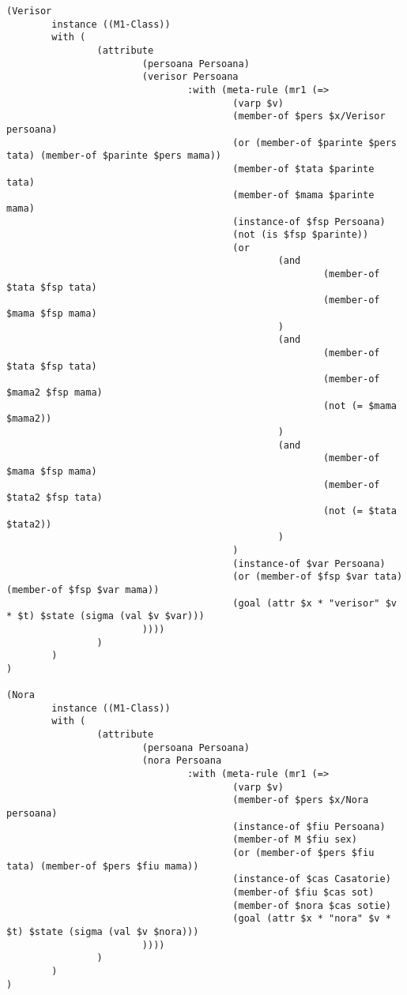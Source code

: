 \documentclass{article}
\begin{document}
{\begin{verbatim}
(Verisor
        instance ((M1-Class))
        with (
                (attribute
                        (persoana Persoana)
                        (verisor Persoana
                                :with (meta-rule (mr1 (=>
                                        (varp $v)
                                        (member-of $pers $x/Verisor persoana)
                                        (or (member-of $parinte $pers tata) (member-of $parinte $pers mama))
                                        (member-of $tata $parinte tata)
                                        (member-of $mama $parinte mama)
                                        (instance-of $fsp Persoana)
                                        (not (is $fsp $parinte))
                                        (or
                                                (and
                                                        (member-of $tata $fsp tata)
                                                        (member-of $mama $fsp mama)
                                                )
                                                (and
                                                        (member-of $tata $fsp tata)
                                                        (member-of $mama2 $fsp mama)
                                                        (not (= $mama $mama2))
                                                )
                                                (and
                                                        (member-of $mama $fsp mama)
                                                        (member-of $tata2 $fsp tata)
                                                        (not (= $tata $tata2))
                                                )
                                        )
                                        (instance-of $var Persoana)
                                        (or (member-of $fsp $var tata) (member-of $fsp $var mama))
                                        (goal (attr $x * "verisor" $v * $t) $state (sigma (val $v $var)))
                        ))))
                )
        )
)

(Nora
        instance ((M1-Class))
        with (
                (attribute
                        (persoana Persoana)
                        (nora Persoana
                                :with (meta-rule (mr1 (=>
                                        (varp $v)
                                        (member-of $pers $x/Nora persoana)
                                        (instance-of $fiu Persoana)
                                        (member-of M $fiu sex)
                                        (or (member-of $pers $fiu tata) (member-of $pers $fiu mama))
                                        (instance-of $cas Casatorie)
                                        (member-of $fiu $cas sot)
                                        (member-of $nora $cas sotie)
                                        (goal (attr $x * "nora" $v * $t) $state (sigma (val $v $nora)))
                        ))))
                )
        )
)


\end{verbatim}}
\end{document}
